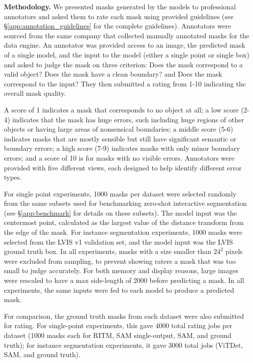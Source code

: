 \documentclass[10pt,twocolumn,letterpaper]{article}
\renewcommand{\paragraph}[1]{\vspace{1.25mm}\noindent\textbf{#1}}
\newcommand{\sam}{SAM\xspace}
\begin{document}
\paragraph{Methodology.} We presented masks generated by the models to professional annotators and asked them to rate each mask using provided guidelines (see \S\ref{app:annotation_guidelines} for the complete guidelines). Annotators were sourced from the same company that collected manually annotated masks for the data engine. An annotator was provided access to an image, the predicted mask of a single model, and the input to the model (either a single point or single box) and asked to judge the mask on three criterion: Does the mask correspond to a valid object? Does the mask have a clean boundary? and Does the mask correspond to the input? They then submitted a rating from 1-10 indicating the overall mask quality.

A score of 1 indicates a mask that corresponds to no object at all; a low score (2-4) indicates that the mask has huge errors, such including huge regions of other objects or having large areas of nonsensical boundaries; a middle score (5-6) indicates masks that are mostly sensible but still have significant semantic or boundary errors; a high score (7-9) indicates masks with only minor boundary errors; and a score of 10 is for masks with no visible errors. Annotators were provided with five different views, each designed to help identify different error types.

For single point experiments, 1000 masks per dataset were selected randomly from the same subsets used for benchmarking zero-shot interactive segmentation (see \S\ref{app:benchmark} for details on these subsets). The model input was the centermost point, calculated as the largest value of the distance transform from the edge of the mask. For instance segmentation experiments, 1000 masks were selected from the LVIS v1 validation set, and the model input was the LVIS ground truth box. In all experiments, masks with a size smaller than $\textrm{24}^\textrm{2}$ pixels were excluded from sampling, to prevent showing raters a mask that was too small to judge accurately. For both memory and display reasons, large images were rescaled to have a max side-length of 2000 before predicting a mask. In all experiments, the same inputs were fed to each model to produce a predicted mask.

For comparison, the ground truth masks from each dataset were also submitted for rating. For single-point experiments, this gave 4000 total rating jobs per dataset (1000 masks each for RITM, \sam single-output, \sam, and ground truth); for instance segmentation experiments, it gave 3000 total jobs (ViTDet, \sam, and ground truth).
\end{document}
